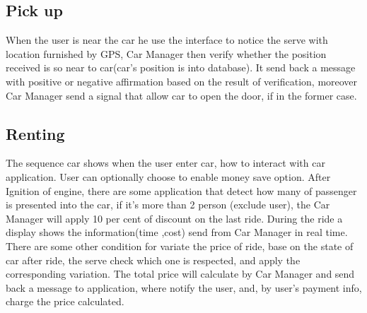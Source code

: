 \documentclass{article}
\begin{document}
\subsection{Pick up}
 When the user is near the car he use the interface to notice the serve with location furnished by GPS, Car Manager then verify whether the position received is so near to car(car's position is into database). It send back a message with positive or negative affirmation based on the result of verification, moreover   Car Manager send a signal that allow car to open the door, if in the former case.
 
 \subsection{Renting}
 The sequence car shows when the user enter car, how to interact with car application. User can optionally  choose to enable money save option. After Ignition of engine, there are some application that detect how many of passenger is presented into the car, if it's more than 2 person (exclude user), the Car Manager will apply 10 per cent of discount on the last ride.  During the ride a display shows the information(time ,cost) send from Car Manager in real time. There are some other condition for variate the price of ride, base on the state of car after ride, the serve check which one is respected, and apply the corresponding variation. The total price will calculate by Car Manager and send back a message to application, where notify the user, and, by user's payment info, charge the price calculated. 
			
\end{document}
